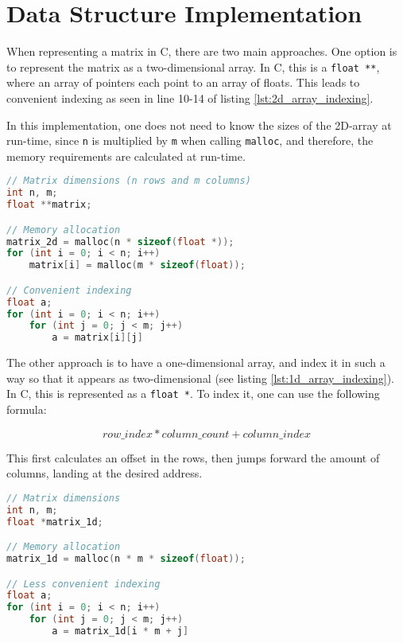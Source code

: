 \section{Data Structure Implementation} \label{sect:datastructure}

When representing a matrix in C, there are two main approaches. One option is to represent the matrix as a two-dimensional array. In C, this is a \texttt{float **}, where an array of pointers each point to an array of floats. This leads to convenient indexing as seen in line 10-14 of listing \ref{lst:2d_array_indexing}.

In this implementation, one does not need to know the sizes of the 2D-array at run-time, since \texttt{n} is multiplied by \texttt{m} when calling \texttt{malloc}, and therefore, the memory requirements are calculated at run-time.

\begin{lstlisting}[language=C, caption={Allocation and indexing of a float **}, label={lst:2d_array_indexing}]
// Matrix dimensions (n rows and m columns)
int n, m;
float **matrix;

// Memory allocation
matrix_2d = malloc(n * sizeof(float *));
for (int i = 0; i < n; i++)
    matrix[i] = malloc(m * sizeof(float));

// Convenient indexing
float a;
for (int i = 0; i < n; i++)
    for (int j = 0; j < m; j++)
        a = matrix[i][j]
\end{lstlisting}

\noindent The other approach is to have a one-dimensional array, and index it in such a way so that it appears as two-dimensional (see listing \ref{lst:1d_array_indexing}). In C, this is represented as a \texttt{float *}. To index it, one can use the following formula: 

\[row\_index * column\_count + column\_index\]

This first calculates an offset in the rows, then jumps forward the amount of columns, landing at the desired address.

\begin{lstlisting}[language=C, caption={Allocation and indexing of a float *}, label={lst:1d_array_indexing}]
// Matrix dimensions
int n, m;
float *matrix_1d;

// Memory allocation
matrix_1d = malloc(n * m * sizeof(float));

// Less convenient indexing
float a;
for (int i = 0; i < n; i++)
    for (int j = 0; j < m; j++)
        a = matrix_1d[i * m + j]
\end{lstlisting}

